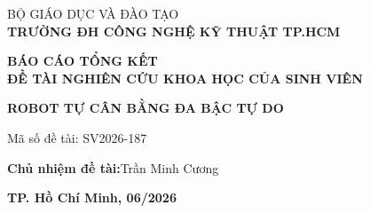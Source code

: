 \documentclass[13pt]{extreport}
\begin{document}
\begin{titlepage}
    \thispagestyle{empty}

    \centering
    \vspace*{1.0cm}

    {\fontsize{13pt}{15pt}\selectfont BỘ GIÁO DỤC VÀ ĐÀO TẠO}\\[0.2cm]
    {\fontsize{14pt}{16pt}\selectfont\bfseries TRƯỜNG ĐH CÔNG NGHỆ KỸ THUẬT TP.HCM}

    \vspace{3.0cm}

    {\fontsize{16pt}{20pt}\selectfont\bfseries BÁO CÁO TỔNG KẾT}\\[0.5cm]
    {\fontsize{14pt}{17pt}\selectfont\bfseries ĐỀ TÀI NGHIÊN CỨU KHOA HỌC CỦA SINH VIÊN}

    \vspace{3.0cm}

    \parbox{12cm}{%
        \centering
        \fontsize{14pt}{18pt}\selectfont\bfseries
        ROBOT TỰ CÂN BẰNG ĐA BẬC TỰ DO
    }

    \vspace{1.0cm}

    {\fontsize{13pt}{15pt}\selectfont Mã số đề tài: SV2026-187}

    \vspace{1.5cm}

    {\fontsize{13pt}{15pt}\selectfont
        \textbf{Chủ nhiệm đề tài:}\quad Trần Minh Cương
    }

    \vspace{7.5cm}

    {\fontsize{13pt}{15pt}\selectfont\bfseries TP. Hồ Chí Minh, 06/2026}

    \vspace{1.0cm}
\end{titlepage}
\end{document}
